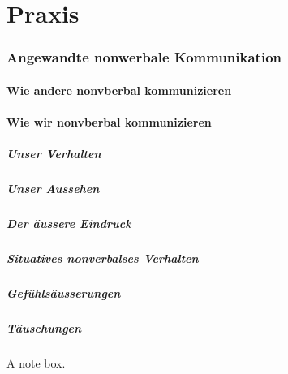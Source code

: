 \documentclass[
    invert-title=false,
    titlepage=true,
    titleimage-ratio=1011,
    parskip=half-,
]{bfhpub}                %
\begin{document}
    

    


    \part{Praxis}


    \section{Angewandte nonwerbale Kommunikation}

    \subsection{Wie andere nonvberbal kommunizieren}
    

    \subsection{Wie wir nonvberbal kommunizieren}

    \subsubsection{Unser Verhalten}

    \subsubsection{Unser Aussehen}

    \subsubsection{Der äussere Eindruck}

    \subsubsection{Situatives nonverbalses Verhalten}

    \subsubsection{Gefühlsäusserungen}

    \subsubsection{Täuschungen}


    \begin{bfhNoteBox}
        A note box.
    \end{bfhNoteBox}

    \printbibliography
\end{document}
